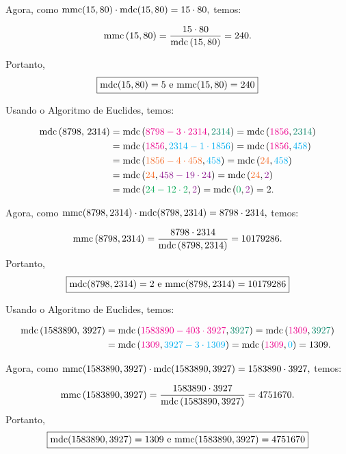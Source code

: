 \documentclass[12pt, a4paper]{article}
\newcommand{\mdc}{{\rm mdc}}
\newcommand{\mmc}{{\rm mmc}}
\newcommand{\negrito}[1]{\mbox{\boldmath{$#1$}}}
\newcommand{\alt}[1]{\textcolor{Floresta}{$\negrito{(#1)} $}}
\begin{document}
\begin{solution}
{  Agora, como $\mmc(15, 80) \cdot \mdc( 15, 80) = 15 \cdot 80,$ temos:

    
    $$\mmc \left(15, 80 \right) =\frac{15\cdot 80}{\mdc \left(15, 80 \right) }=240.$$

Portanto,
\[
\boxed{\mdc(15,80) = 5 \text{ e } \mmc(15,80) = 240}
\]    
    
    \task[\alt{d}] Usando o Algoritmo de Euclides, temos:

    \begin{align*}
    \mdc \left( \text{8798, 2314} \right)&=\mdc \left( \textcolor{Magenta}{8798-3\cdot2314}, \textcolor{PineGreen}{2314} \right) =\mdc \left( \textcolor{Magenta}{1856}, \textcolor{PineGreen}{2314} \right)\\& =\mdc \left( \textcolor{Magenta}{1856}, \textcolor{Cyan}{2314-1\cdot1856} \right) =
    \mdc \left( \textcolor{Magenta}{1856}, \textcolor{Cyan}{458} \right)\\&=\mdc \left( \textcolor{Orange}{1856-4\cdot458}, \textcolor{Cyan}{458} \right) =\mdc \left( \textcolor{Orange}{24}, \textcolor{Cyan}{458} \right)\\& =\mdc \left( \textcolor{Orange}{24}, \textcolor{Plum}{458-19\cdot24} \right) =\mdc \left( \textcolor{Orange}{24}, \textcolor{Plum}{2} \right)\\& =
    \mdc \left( \textcolor{Green}{24-12\cdot2} , \textcolor{Plum}{2} \right) =\mdc \left( \textcolor{Green}{0}, \textcolor{Plum}{2} \right) =2.
    \end{align*}

  Agora, como $\mmc(8798, 2314) \cdot \mdc( 8798, 2314) = 8798 \cdot 2314,$ temos:

    
    $$\mmc \left(8798, 2314 \right) =\frac{8798\cdot2314}{\mdc \left( 8798, 2314\right) }=10179286.$$
Portanto,
\[
\boxed{\mdc(8798, 2314) = 2 \text{ e } \mmc(8798, 2314) = 10179286}
\]  

    \task[\alt{e}] Usando o Algoritmo de Euclides, temos:

    \begin{align*}
    \mdc \left( \text{1583890, 3927} \right)&=\mdc \left( \textcolor{Magenta}{1583890-403\cdot3927}, \textcolor{PineGreen}{3927} \right) =\mdc \left( \textcolor{Magenta}{1309}, \textcolor{PineGreen}{3927} \right)\\& =\mdc \left( \textcolor{Magenta}{1309}, \textcolor{Cyan}{3927-3\cdot1309} \right) =
    \mdc \left( \textcolor{Magenta}{1309}, \textcolor{Cyan}{0} \right) =1309.
    \end{align*}

  Agora, como $\mmc(1583890, 3927) \cdot \mdc( 1583890, 3927) = 1583890 \cdot 3927,$ temos:

    
    $$\mmc \left(1583890, 3927 \right) =\frac{1583890\cdot3927}{\mdc \left( 1583890, 3927\right) }=4751670.$$
Portanto,
\[
\boxed{\mdc(1583890, 3927) = 1309 \text{ e } \mmc(1583890, 3927) = 4751670}
\]  
    }
\end{solution}
\end{document}
